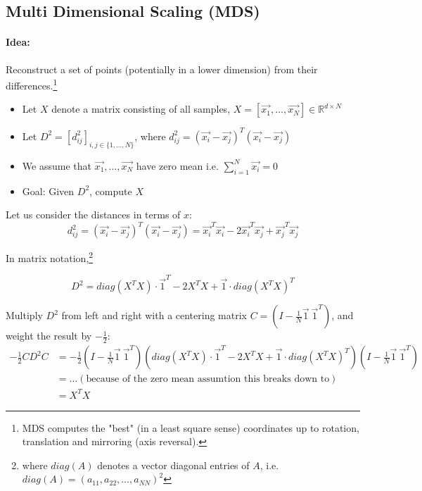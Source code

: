 
\subsection*{Multi Dimensional Scaling (MDS)}

\paragraph{Idea:} Reconstruct a set of points (potentially in a lower dimension) from their differences.\footnote{MDS computes the "best" (in a least square sense) coordinates up to rotation, translation and mirroring (axis reversal).}

\begin{itemize}
    \item  Let \(X\) denote a matrix consisting of all samples, \(X=[\vec{x_1}, \dots, \vec{x_N}] \in \mathbb{R}^{d \times N}\)
    \item  Let \(D^2 = [d_{ij}^2]_{i, j \in \{1, \dots, N\}}\), where \(d_{ij}^2 = (\vec{x_i} - \vec{x_j})^T (\vec{x_i} - \vec{x_j})\)
    \item  We assume that \(\vec{x_1}, \dots, \vec{x_N}\) have zero mean i.e. \(\sum_{i=1}^N \vec{x_i} = 0\) %
    \item  Goal: Given \(D^2\), compute \(X\)
\end{itemize}

Let us consider the distances in terms of \(x\):
\[d_{ij}^2 = (\vec{x_i} - \vec{x_j})^T(\vec{x_i} - \vec{x_j})=\vec{x_i}^T \vec{x_i} - 2 \vec{x_i}^T \vec{x_j} + \vec{x_j}^T \vec{x_j} \]

In matrix notation,\footnote{where \(diag(A)\) denotes a vector diagonal entries of \(A\), i.e. \(diag(A) = (a_{11}, a_{22}, \dots, a_{NN})^2\)}

\[D^2 = diag(X^T X) \cdot \vec{1}^T - 2X^TX + \vec{1} \cdot diag(X^T X)^T\]


Multiply \(D^2\) from left and right with a centering matrix \(C = (I - \frac{1}{N} \vec{1} \ \vec{1}^T)\), and weight the result by \(-\frac{1}{2}\):
\begin{align*}
    -\frac{1}{2} C D^2 C &= -\frac{1}{2} (I- \frac{1}{N} \vec{1} \ \vec{1}^T) (diag(X^T X) \cdot \vec{1}^T - 2X^TX + \vec{1} \cdot diag(X^T X)^T)(I- \frac{1}{N} \vec{1} \ \vec{1}^T)\\
    &= \dots (\text{because of the zero mean assumtion this breaks down to}) \\
    &= X^T X
\end{align*}

